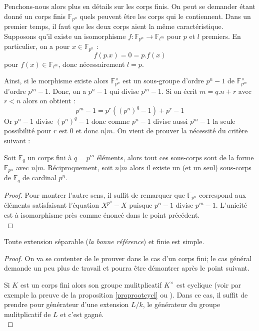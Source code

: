 \documentclass[a4paper]{article} %
\numberwithin{section}{part}
\numberwithin{equation}{section}
\newcommand\GF[1]{\mathbb{F}_{#1}}
\begin{document}
Penchons-nous alors plus en détails sur les corps finis. On peut se demander
étant donné un corps finis $\GF{p^n}$ quels peuvent être les corps qui le
contiennent. Dans un premier temps, il faut que les deux corps aient la même
caractéristique. Supposons qu'il existe un isomorphisme $f : \GF{p^n} \to 
\GF{l^m}$ pour $p$ et $l$ premiers. En particulier, on a pour $x\in\GF{p^n}$ :
\[f(p.x) = 0 = p.f(x)\]
pour $f(x)\in\GF{l^m}$, donc nécessairement $l = p$.\par
Ainsi, si le morphisme existe alors $\GF{p^n}^{\times}$ est un sous-groupe
d'ordre $p^n - 1$ de $\GF{p^m}^{\times}$ d'ordre $p^m - 1$. Donc, on a $p^n - 1$
qui divise $p^m - 1$. Si on écrit $m = q.n + r$ avec $r < n$ alors on obtient :
\[p^m - 1 = p^r((p^n)^q - 1) + p^r - 1\]
Or $p^n - 1$ divise $(p^n)^q - 1$ donc comme $p^n - 1$ divise aussi $p^m - 1$ la
seule possibilité pour $r$ est $0$ et donc $n|m$. On vient de prouver la
nécessité du critère suivant :

\begin{prop}
Soit $\GF{q}$ un corps fini à $q = p^m$ éléments, alors tout ces sous-corps sont
de la forme $\GF{p^n}$ avec $n|m$. Réciproquement, soit $n|m$ alors il existe un
(et un seul) sous-corps de $\GF{q}$ de cardinal $p^n$.
\end{prop}
\begin{proof}
Pour montrer l'autre sens, il suffit de remarquer que $\GF{p^n}$ correspond aux
éléments satisfaisant l'équation $X^{p^n} - X$ puisque $p^n - 1$ divise $p^m -
1$. L'unicité est à isomorphisme près comme énoncé dans le point précédent.\\
\end{proof}

\begin{thm}
\label{thelemprim}
Toute extension séparable (\textit{la bonne référence}) et finie est simple.
\end{thm}
\begin{proof}
On va se contenter de le prouver dans le cas d'un corps fini; le cas général
demande un peu plus de travail et pourra être démontrer après le point
suivant.\par
Si $K$ est un corps fini alors son groupe mulitplicatif $K^{\times}$ est
cyclique (voir par exemple la preuve de la proposition \ref{proprootcycl} ou
\cite[p.~50]{LiNi}). Dans ce cas, il suffit de prendre pour générateur d'une
extension $L/k$, le générateur du groupe mulitplicatif de $L$ et c'est gagné.\\
\end{proof}
\end{document}
